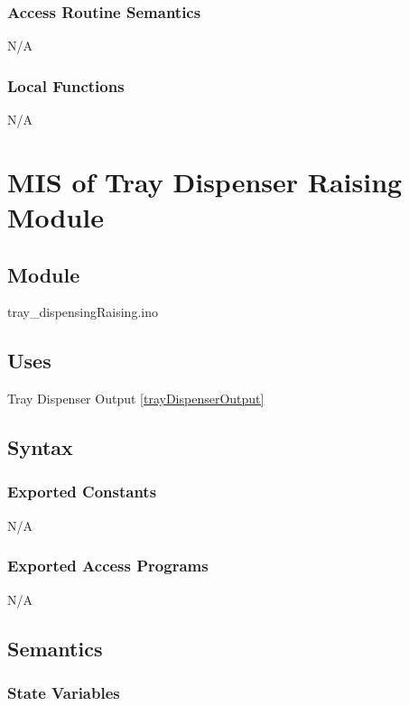\documentclass[12pt, titlepage]{article}
\begin{document}
\subsubsection{Access Routine Semantics}

N/A


\subsubsection{Local Functions}

N/A


  \section{MIS of Tray Dispenser Raising Module} \label{trayDispenserRaising} 

\subsection{Module}

tray\_dispensingRaising.ino

\subsection{Uses}

Tray Dispenser Output \ref{trayDispenserOutput}
\subsection{Syntax}

\subsubsection{Exported Constants}
N/A

\subsubsection{Exported Access Programs}

N/A


\subsection{Semantics}

\subsubsection{State Variables}
\end{document}
